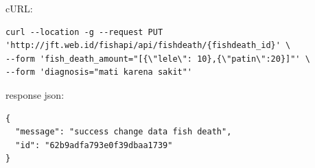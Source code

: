 \begin{enumerate}[1.]
cURL:

\begin{lstlisting}
curl --location -g --request PUT 'http://jft.web.id/fishapi/api/fishdeath/{fishdeath_id}' \
--form 'fish_death_amount="[{\"lele\": 10},{\"patin\":20}]"' \
--form 'diagnosis="mati karena sakit"'
\end{lstlisting}

response json:

\begin{lstlisting}
{
  "message": "success change data fish death",
  "id": "62b9adfa793e0f39dbaa1739"
}
\end{lstlisting}









\end{enumerate}